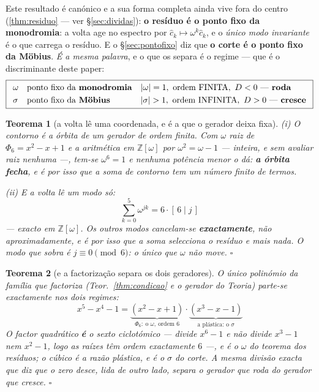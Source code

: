 \documentclass[11pt,a4paper]{article}
\newtheorem{teorema}{Teorema}
\newcommand{\abs}[1]{\lvert #1\rvert}
\begin{document}
\noindent Este resultado é canónico e a sua forma completa ainda vive fora do centro (\ref{thm:residuo} --- ver \S\ref{sec:dividas}): \textbf{o resíduo é
o ponto fixo da monodromia}: a volta age no espectro por
$\hat c_k\mapsto\omega^{k}\hat c_k$, e o \emph{único modo invariante} é o que carrega
o resíduo. E o \S\ref{sec:pontofixo} diz que \textbf{o corte é o ponto fixo da
Möbius}. \emph{É a mesma palavra}, e o que os separa é o regime --- que é o
discriminante deste paper:
\[
\boxed{
\begin{array}{lll}
\omega & \text{ponto fixo da \textbf{monodromia}} & \abs{\omega}=1,\ \text{ordem
FINITA},\ D<0\ \text{--- \textbf{roda}}\\[3pt]
\sigma & \text{ponto fixo da \textbf{Möbius}} & \abs{\sigma}>1,\ \text{ordem
INFINITA},\ D>0\ \text{--- \textbf{cresce}}
\end{array}}
\]

\begin{teorema}[a volta lê uma coordenada, e é a que o gerador deixa fixa]\label{thm:residuo-geo}
\emph{(i) O contorno é a órbita de um gerador de ordem finita.} Com
$\omega$ raiz de $\Phi_6=x^{2}-x+1$ e a aritmética em $\mathbb{Z}[\omega]$ por
$\omega^{2}=\omega-1$ --- \emph{inteira, e sem avaliar raiz nenhuma} ---, tem-se
$\omega^{6}=1$ e nenhuma potência menor o dá: \textbf{a órbita fecha}, e é por isso
que a soma de contorno tem um número finito de termos.

\emph{(ii) E a volta lê um modo só:}
\[
\boxed{\;\sum_{k=0}^{5}\omega^{jk}=6\cdot[\,6\mid j\,]\;}
\]
--- exacto em $\mathbb{Z}[\omega]$. Os outros modos cancelam-se
\textbf{exactamente}, não aproximadamente, e é por isso que a soma selecciona o
resíduo e mais nada. O modo que sobra é $j\equiv0\pmod 6$: \emph{o único que
$\omega$ não move}. $\square$
\end{teorema}

\begin{teorema}[e a factorização separa os dois geradores]\label{thm:separa}
O único polinómio da família que factoriza (Teor.~\ref{thm:condicao} e o
\emph{gerador} do \emph{Teoria}) parte-se exactamente nos dois regimes:
\[
\boxed{\;x^{5}-x^{4}-1=\underbrace{(x^{2}-x+1)}_{\Phi_6:\ \text{o }\omega,\ \text{ordem }6}
\cdot\underbrace{(x^{3}-x-1)}_{\text{a plástica: o }\sigma}\;}
\]
O factor quadrático \textbf{é} o sexto ciclotómico --- divide $x^{6}-1$ e \emph{não}
divide $x^{3}-1$ nem $x^{2}-1$, logo as raízes têm ordem exactamente $6$ ---, e é o
$\omega$ do teorema dos resíduos; o cúbico é a razão plástica, e é o $\sigma$ do
corte. \emph{A mesma divisão exacta que diz que o zero desce, lida de outro lado,
separa o gerador que roda do gerador que cresce.} $\square$
\end{teorema}
\end{document}
